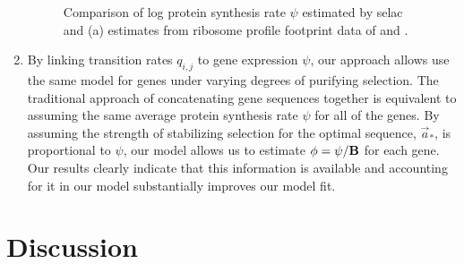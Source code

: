 \documentclass{article}
\newcommand{\Func}{\ensuremath{\text{\textbf{B}}}\xspace}
\newcommand{\aoptvec}{\ensuremath{\Vec{a}_*}\xspace}
\newcommand{\qij}{\ensuremath{q_{i,j}}\xspace}
\begin{document}
\begin{enumerate}
\begin{figure}[H]
\caption{Comparison of log protein synthesis rate $\psi$  estimated by selac and (a) estimates from ribosome profile footprint data of \citet{IngoliaEtAl2009} and \citet{HolstegeEtAl1998}.
}
\end{figure}
\item By linking transition rates $\qij$ to gene expression $\psi$, our approach allows use the same model for genes under varying degrees of purifying selection.
The traditional approach of concatenating gene sequences together is equivalent to assuming the same average protein synthesis rate $\psi$ for all of the genes.
By assuming the strength of stabilizing selection for the optimal sequence, \aoptvec, is proportional to $\psi$,  our model allows us to estimate $\phi = \psi/\Func$ for each gene.
Our results clearly indicate that this information is available and accounting for it in our model substantially improves our model fit.

\end{enumerate}
\section*{Discussion}
\end{document}
